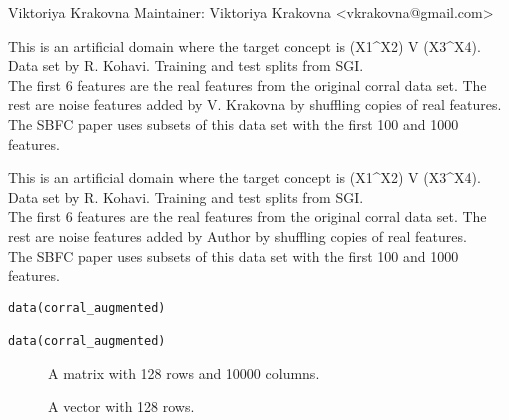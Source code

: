 \documentclass[a4paper]{book}
\begin{document}
%
\begin{Author}\relax
Viktoriya Krakovna
Maintainer: Viktoriya Krakovna <vkrakovna@gmail.com>
\end{Author}
%
\begin{Description}\relax
This is an artificial domain where the target concept is (X1\textasciicircum{}X2) V (X3\textasciicircum{}X4). \\{}
Data set by R. Kohavi. Training and test splits from SGI. \\{}
The first 6 features are the real features from the original corral data set.
The rest are noise features added by V. Krakovna by shuffling copies of real features.\\{}
The SBFC paper uses subsets of this data set with the first 100 and 1000 features.

This is an artificial domain where the target concept is (X1\textasciicircum{}X2) V (X3\textasciicircum{}X4). \\{}
Data set by R. Kohavi. Training and test splits from SGI. \\{}
The first 6 features are the real features from the original corral data set.
The rest are noise features added by Author by shuffling copies of real features.\\{}
The SBFC paper uses subsets of this data set with the first 100 and 1000 features.
\end{Description}
%
\begin{Usage}
\begin{verbatim}
data(corral_augmented)

data(corral_augmented)
\end{verbatim}
\end{Usage}
%
\begin{Format}
\begin{description}

\item[] A matrix with 128 rows and 10000 columns.
\item[] A vector with 128 rows.

\end{description}
\end{Format}
%
\begin{References}\relax
{}


\end{References}
\end{document}
